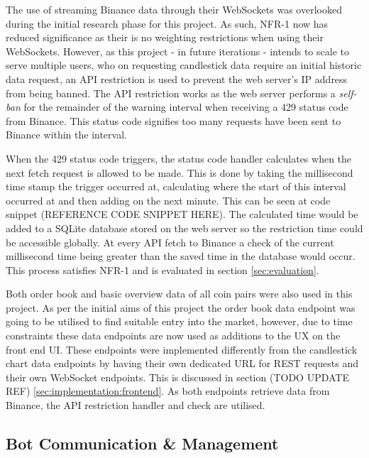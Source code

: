 The use of streaming Binance data through their WebSockets was overlooked during the initial research phase for this project. As such, NFR-1 now has reduced significance as their is no weighting restrictions when using their WebSockets. However, as this project - in future iterations - intends to scale to serve multiple users, who on requesting candlestick data require an initial historic data request, an API restriction is used to prevent the web server's IP address from being banned. The API restriction works as the web server performs a \textit{self-ban} for the remainder of the warning interval when receiving a 429 status code from Binance. This status code signifies too many requests have been sent to Binance within the interval.

When the 429 status code triggers, the status code handler calculates when the next fetch request is allowed to be made. This is done by taking the millisecond time stamp the trigger occurred at, calculating where the start of this interval occurred at and then adding on the next minute. This can be seen at code snippet (REFERENCE CODE SNIPPET HERE). The calculated time would be added to a SQLite database stored on the web server so the restriction time could be accessible globally. At every API fetch to Binance a check of the current millisecond time being greater than the saved time in the database would occur. This process satisfies NFR-1 and is evaluated in section \ref{sec:evaluation}.

Both order book and basic overview data of all coin pairs were also used in this project. As per the initial aims of this project the order book data endpoint was going to be utilised to find suitable entry into the market, however, due to time constraints these data endpoints are now used as additions to the UX on the front end UI. These endpoints were implemented differently from the candlestick chart data endpoints by having their own dedicated URL for REST requests and their own WebSocket endpoints. This is discussed in section (TODO UPDATE REF) \ref{sec:implementation:frontend}. As both endpoints retrieve data from Binance, the API restriction handler and check are utilised.

\subsection{Bot Communication \& Management}
\label{sec:implementation:info_comm:bot_comm_management}

